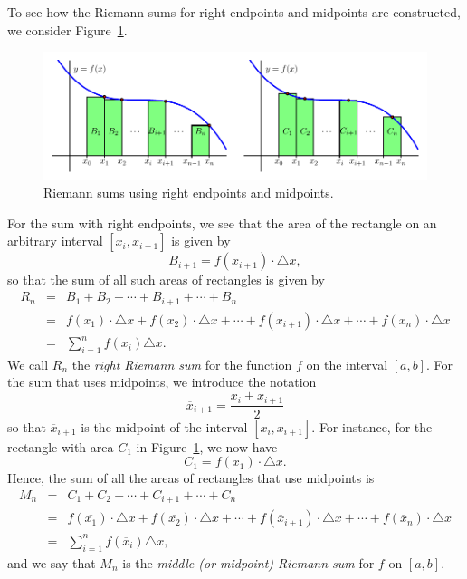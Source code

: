 To see how the Riemann sums for right endpoints and midpoints are constructed, we consider Figure~\ref{F:4.2.RightMidSum}.
\begin{figure}[h]
\begin{center}
\includegraphics{figures/4_2_RightMidSum}
\caption{Riemann sums using right endpoints and midpoints.} \label{F:4.2.RightMidSum}
\end{center}
\end{figure}
For the sum with right endpoints, we see that the area of the rectangle on an arbitrary interval $[x_i, x_{i+1}]$ is given by
$$B_{i+1} = f(x_{i+1}) \cdot \triangle x,$$
so that the sum of all such areas of rectangles is given by
\begin{eqnarray*}
R_n & = & B_1 + B_2 + \cdots + B_{i+1} + \cdots + B_n \\
	& = &  f(x_1) \cdot \triangle x + f(x_2) \cdot \triangle x + \cdots + f(x_{i+1}) \cdot \triangle x + \cdots + f(x_{n}) \cdot \triangle x \\ 
	& = & \sum_{i=1}^{n} f(x_i) \triangle x.
\end{eqnarray*}
We call $R_n$ the \emph{right Riemann sum}  for the function $f$ on the interval $[a,b]$.  For the sum that uses midpoints, we introduce the notation
$$\overline{x}_{i+1} = \frac{x_{i} + x_{i+1}}{2}$$
so that $\overline{x}_{i+1}$ is the midpoint of the interval $[x_i, x_{i+1}]$.  For instance, for the rectangle with area $C_1$ in Figure~\ref{F:4.2.RightMidSum}, we now have
$$C_1 = f(\overline{x}_1) \cdot \triangle x.$$
Hence, the sum of all the areas of rectangles that use midpoints is 
\begin{eqnarray*}
M_n & = & C_1 + C_2 + \cdots + C_{i+1} + \cdots + C_n \\
	& = &  f(\overline{x_1}) \cdot \triangle x + f(\overline{x_2}) \cdot \triangle x + \cdots + f(\overline{x}_{i+1}) \cdot \triangle x + \cdots + f(\overline{x}_{n}) \cdot \triangle x \\ 
	& = & \sum_{i=1}^{n} f(\overline{x}_i) \triangle x,
\end{eqnarray*}
and we say that $M_n$ is the \emph{middle (or midpoint) Riemann sum}  for $f$ on $[a,b]$.

